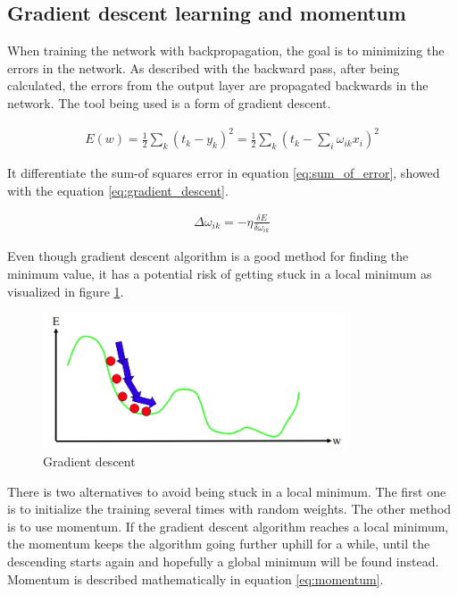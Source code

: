 \documentclass[USenglish]{ifimaster}  %
\begin{document}
\subsection{Gradient descent learning and momentum}
When training the network with backpropagation, the goal is to minimizing the errors in the network. As described with the backward pass, after being calculated, the errors from the output layer are propagated backwards in the network. The tool being used is a form of gradient descent. 

\begin{equation}\label{eq:sum_of_error}
\begin{aligned}
E(w) = \frac{1}{2} \sum_{k}(t_k - y_k)^2 = \frac{1}{2}\sum_{k}(t_k - \sum_{i} \omega_{ik}x_i)^2
\end{aligned}
\end{equation}

It differentiate the sum-of squares error in equation \ref{eq:sum_of_error}, showed with the equation \ref{eq:gradient_descent}.  

\begin{equation}\label{eq:gradient_descent}
\begin{aligned}
\Delta\omega_{ik} = -\eta\frac{\delta E}{\delta \omega_{ik}}
\end{aligned}
\end{equation}

Even though gradient descent algorithm is a good method for finding the minimum value, it has a potential risk of getting stuck in a local minimum as visualized in figure \ref{fig:gradient_descent}.

\begin{figure}[ht]
    \centering
    \includegraphics[width=0.8\textwidth]{bilder/gradient_descent.png}
    \caption{Gradient descent \cite{website:inf_4490_mlp}}
    \label{fig:gradient_descent}
\end{figure}

There is two alternatives to avoid being stuck in a local minimum. The first one is to initialize the training several times with random weights. The other method is to use momentum. If the gradient descent algorithm reaches a local minimum, the momentum keeps the algorithm going further uphill for a while, until the descending starts again and hopefully a global minimum will be found instead. Momentum is described mathematically in equation \ref{eq:momentum}. 
\end{document}
